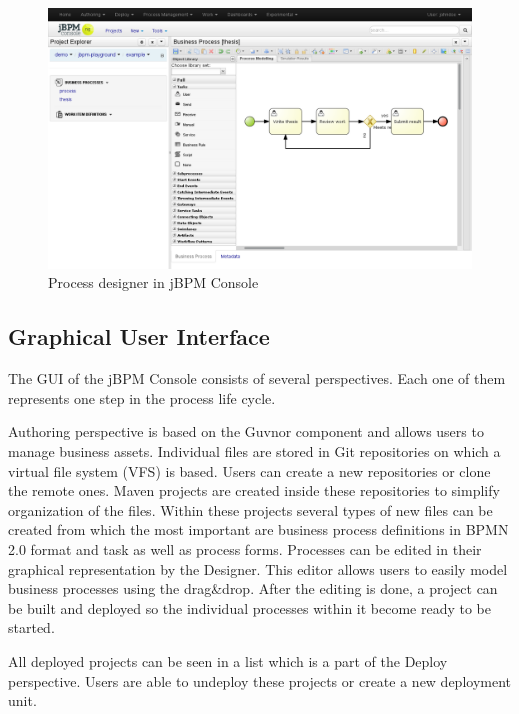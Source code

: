 \documentclass[12pt,oneside,final]{fithesis2}
\begin{document}
\begin{figure}[ht!]
\centering
\includegraphics[width=\textwidth]{images/jbpm-console.png}
\caption{Process designer in jBPM Console}
\label{fig:jbpm-console}
\end{figure}

\subsection{Graphical User Interface}
The GUI of the jBPM Console consists of several perspectives.
Each one of them represents one step in the process life cycle.

Authoring perspective is based on the Guvnor component and allows users to manage business assets.
Individual files are stored in Git\footnotemark{} repositories on which a virtual file system (VFS) is based.
Users can create a new repositories or clone the remote ones.
Maven\footnotemark{} projects are created inside these repositories to simplify organization of the files.
Within these projects several types of new files can be created from which the most important are business process definitions in BPMN 2.0 format and task as well as process forms.
Processes can be edited in their graphical representation by the Designer.
This editor allows users to easily model business processes using the drag\&drop.
After the editing is done, a project can be built and deployed so the individual processes within it become ready to be started.

All deployed projects can be seen in a list which is a part of the Deploy perspective.
Users are able to undeploy these projects or create a new deployment unit.
\end{document}
